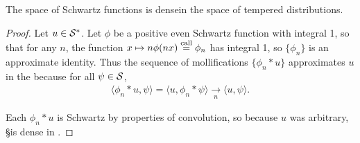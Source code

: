     \begin{thm}
      \label{thm:sdenseinss}
      The space of Schwartz functions is dense\footnotemark in the space of tempered distributions.
    \end{thm}
    \begin{proof}
      Let $u\in\SS$.
      Let $\phi$ be a positive even Schwartz function with integral 1, so that for any $n$, the function $x\mapsto n\phi(nx) \call \phi_n$ has integral 1, so $\{\phi_n\}$ is an approximate identity.
      Thus the sequence of mollifications $\{\phi_n*u\}$ approximates $u$ in the \ws because for all $\psi\in\S$, 
      \begin{align*}
        \langle \phi_n*u, \psi\rangle = \langle u, \phi_n*\psi\rangle \underset{n}{\longrightarrow} \langle u,\psi\rangle \text{.}
      \end{align*}

      Each $\phi_n*u$ is Schwartz by properties of convolution, so because $u$ was arbitrary, \S is dense in \SS.
    \end{proof}


